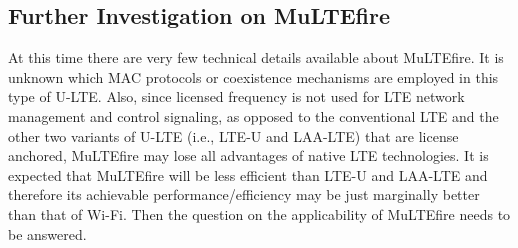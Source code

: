 \documentclass[journal,draftclsnofoot,12pt,onecolumn]{IEEEtran}
\begin{document}
\subsection{Further Investigation on MuLTEfire}

At this time there are very few technical details available about MuLTEfire. It is unknown which MAC protocols or coexistence mechanisms are employed in this type of U-LTE. Also, since licensed frequency is not used for LTE network management and control signaling, as opposed to the conventional LTE and the other two variants of U-LTE (i.e., LTE-U and LAA-LTE) that are license anchored, MuLTEfire may lose all advantages of native LTE technologies. It is expected that MuLTEfire will be less efficient than LTE-U and LAA-LTE and therefore its achievable performance/efficiency may be just marginally better than that of Wi-Fi. Then the question on the applicability of MuLTEfire needs to be answered.







\vfill{}
\end{document}
